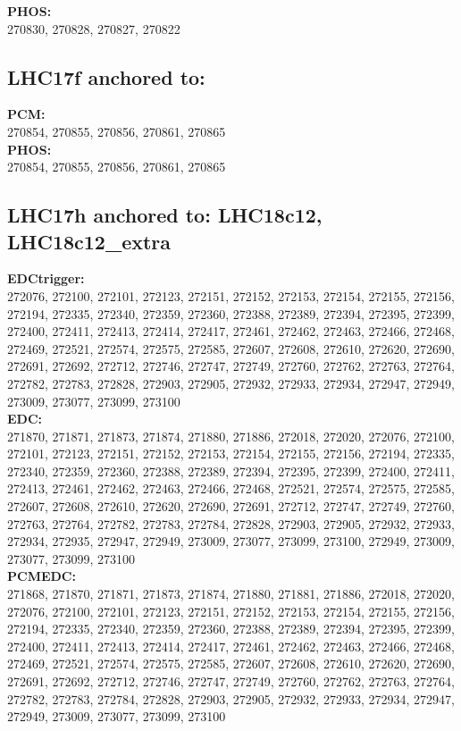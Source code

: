  \textbf{PHOS:}\\
270830, 270828, 270827, 270822\\

 \subsection{LHC17f anchored to:  }

 \textbf{PCM:}\\
270854, 270855, 270856, 270861, 270865\\

 \textbf{PHOS:}\\
270854, 270855, 270856, 270861, 270865\\

 \subsection{LHC17h anchored to: LHC18c12, LHC18c12\_extra}

 \textbf{EDCtrigger:}\\
272076, 272100, 272101, 272123, 272151, 272152, 272153, 272154, 272155, 272156, 272194, 272335, 272340, 272359, 272360, 272388, 272389, 272394, 272395, 272399, 272400, 272411, 272413, 272414, 272417, 272461, 272462, 272463, 272466, 272468, 272469, 272521, 272574, 272575, 272585, 272607, 272608, 272610, 272620, 272690, 272691, 272692, 272712, 272746, 272747, 272749, 272760, 272762, 272763, 272764, 272782, 272783, 272828, 272903, 272905, 272932, 272933, 272934, 272947, 272949, 273009, 273077, 273099, 273100\\

 \textbf{EDC:}\\
271870, 271871, 271873, 271874, 271880, 271886, 272018, 272020, 272076, 272100, 272101, 272123, 272151, 272152, 272153, 272154, 272155, 272156, 272194, 272335, 272340, 272359, 272360, 272388, 272389, 272394, 272395, 272399, 272400, 272411, 272413, 272461, 272462, 272463, 272466, 272468, 272521, 272574, 272575, 272585, 272607, 272608, 272610, 272620, 272690, 272691, 272712, 272747, 272749, 272760, 272763, 272764, 272782, 272783, 272784, 272828, 272903, 272905, 272932, 272933, 272934, 272935, 272947, 272949, 273009, 273077, 273099, 273100, 272949, 273009, 273077, 273099, 273100\\

 \textbf{PCMEDC:}\\
271868, 271870, 271871, 271873, 271874, 271880, 271881, 271886, 272018, 272020, 272076, 272100, 272101, 272123, 272151, 272152, 272153, 272154, 272155, 272156, 272194, 272335, 272340, 272359, 272360, 272388, 272389, 272394, 272395, 272399, 272400, 272411, 272413, 272414, 272417, 272461, 272462, 272463, 272466, 272468, 272469, 272521, 272574, 272575, 272585, 272607, 272608, 272610, 272620, 272690, 272691, 272692, 272712, 272746, 272747, 272749, 272760, 272762, 272763, 272764, 272782, 272783, 272784, 272828, 272903, 272905, 272932, 272933, 272934, 272947, 272949, 273009, 273077, 273099, 273100\\

